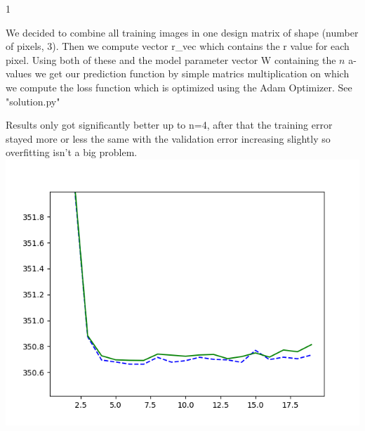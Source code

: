 \documentclass{article}
\begin{document}
    \begin{ukon-infie}[12.11.17]{1}

		
		\begin{exercise}[p=20]{}
		We decided to combine all training images in one design matrix of shape (number of pixels, 3). Then we compute vector r\_vec which contains the r value for each pixel.  Using both of these and the model parameter vector W containing the $n$ a-values we get our prediction function by simple matrics multiplication on which we compute the loss function which is optimized using the Adam Optimizer. See "solution.py" 	
		\end{exercise}
		
		\begin{exercise}[p=10]{}
        Results only got significantly better up to n=4, after that the training error stayed more or less the same with the validation error increasing slightly so overfitting isn't a big problem.\\
        \includegraphics[scale=0.5]{poly_1-20_zoom.png}	
		\end{exercise}
		

\end{ukon-infie}
\end{document}
